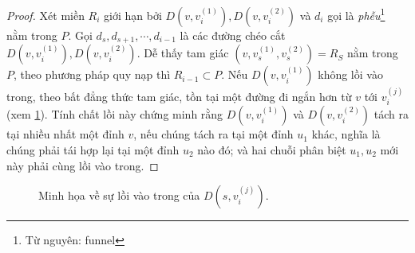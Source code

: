 \begin{proof}
    Xét miền $R_i$  giới hạn bởi $D\left(v, v^{(1)}_i\right), D\left(v, v^{(2)}_i\right)$ và $d_i$  gọi là \textit{phễu}\footnote{Từ nguyên: funnel} nằm trong $P$. Gọi $d_s, d_{s+1}, \cdots, d_{i-1}$ là các đường chéo cắt $D\left(v, v^{(1)}_i\right), D\left(v, v^{(2)}_i\right)$. Dễ thấy tam giác $\left(v, v^{(1)}_s, v^{(2)}_s\right) = R_S$  nằm trong $P$, theo phương pháp quy nạp thì $R_{i-1} \subset P$. Nếu $D\left(v, v^{(1)}_i\right)$ không lồi vào trong, theo bất đẳng thức tam giác, tồn tại một đường đi ngắn hơn từ $v$ tới $v^{(j)}_i$ (xem \ref{fig:2}). Tính chất lồi này chứng minh rằng $D\left(v, v^{(1)}_i\right)$ và $ D\left(v, v^{(2)}_i\right)$ tách ra tại nhiều nhất một đỉnh $v$, nếu chúng tách ra tại một đỉnh $u_1$ khác, nghĩa là chúng phải tái hợp lại tại một đỉnh $u_2$ nào đó; và hai chuỗi phân biệt $u_1, u_2$ mới này phải cùng lồi vào trong.
\end{proof}



\begin{figure}[h] %
  \centering
  \caption{Minh họa về sự lồi vào trong của $D\left(s,v^{(j)}_i\right)$.}
  \label{fig:2} %
\end{figure} 





